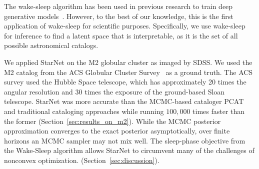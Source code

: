 The wake-sleep algorithm has been used in previous research to train deep generative models~\cite{Hinton1995wake_sleep, bornschein2014reweighted, le2020revisiting}.
However, to the best of our knowledge, this is the first application of wake-sleep for scientific purposes. 
Specifically, we use wake-sleep for inference to find a latent space that is interpretable, as it is the set of all possible astronomical catalogs.


We applied StarNet on the M2 globular cluster as imaged by SDSS.
We used the M2 catalog from the ACS Globular Cluster Survey~\cite{Sarajedini_2007} as a ground truth. 
The ACS survey used the Hubble Space telescope, 
which has approximately 20 times the angular resolution and 30 times the exposure of the ground-based Sloan telescope. 
StarNet was more accurate than the MCMC-based cataloger PCAT and traditional cataloging approaches while running $100,000$ times faster than the former (Section~\ref{sec:results_on_m2}).
While the MCMC posterior approximation converges to the exact posterior asymptotically, over finite horizons an MCMC sampler may not mix well. The sleep-phase objective from the Wake-Sleep algorithm allows StarNet to circumvent many of the challenges of nonconvex optimization.
(Section~\ref{sec:discussion}).



















